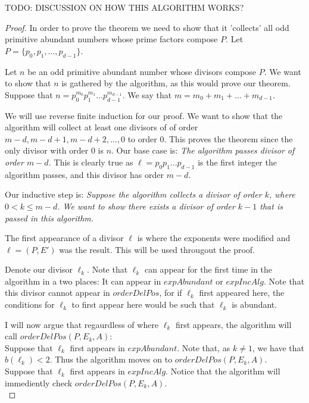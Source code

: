 \documentclass[../paper.tex]{subfiles}
\begin{document}
TODO: DISCUSSION ON HOW THIS ALGORITHM WORKS?

\begin{proof}
  In order to prove the theorem we need to show that it
'collects' all odd primitive abundant numbers whose prime factors
compose $P$. Let $P = \{p_0, p_1, ..., p_{d-1}\}$.

  Let $n$ be an odd primitive abundant number whose divisors
compose $P$. We want to show that $n$ is gathered by the
algorithm, as this would prove our theorem. Suppose that $n =
p_0^{m_0}p_1^{m_1} ... p_{d-1}^{m_{d-1}}$. We say that $m = m_0
+ m_1 + ... + m_{d-1}$. 

  We will use reverse finite induction for our proof. We want to show that
the algorithm will collect at least one divisors of of order $m -
d, m - d + 1, m - d + 2, ..., 0$ to order $0$. This proves the
theorem since the only divisor with order $0$ is $n$.
Our base case is: \textit{The algorithm passes divisor of order $m
- d$.} This is clearly true as $\ell = p_0 p_1 ... p_{d-1}$ is the 
first integer the algorithm passes, and this divisor has order 
$m-d$.

Our inductive step is:
\textit{Suppose the algorithm collects a divisor of order $k$,
where $0 < k \leq m - d $. We want to show there exists a divisor
of order $k - 1$ that is passed in this algorithm.}

  The first appearance of a divisor $\ell$ is where the exponents were
modified and $\ell = (P, E')$ was the result. This will be used
througout the proof.

Denote our divisor $\ell_k$. Note that
$\ell_k$ can appear for the first time in the algorithm in a two
places: It can appear in $expAbundant$ or $expIncAlg$. Note that
this divisor cannot appear in $orderDelPos$, for if $\ell_k$ first
appeared here, the conditions for $\ell_k$ to first appear here
would be such that $\ell_k$ is abundant.

  I will now argue that regaurdless of where $\ell_k$ first
appears, the algorithm will call $orderDelPos(P,E_k,A)$:
\\

Suppose that $\ell_k$ first appears in $expAbundant$. Note that, 
as $k \neq 1$, we have that $b(\ell_k) < 2$. Thus the algorithm 
moves on to $orderDelPos(P, E_k, A)$.
\\

Suppose that $\ell_k$ first appears in $expIncAlg$. Notice that
the algorithm will immediently check $orderDelPos(P, E_k, A)$.
\\


\end{proof}
\end{document}
